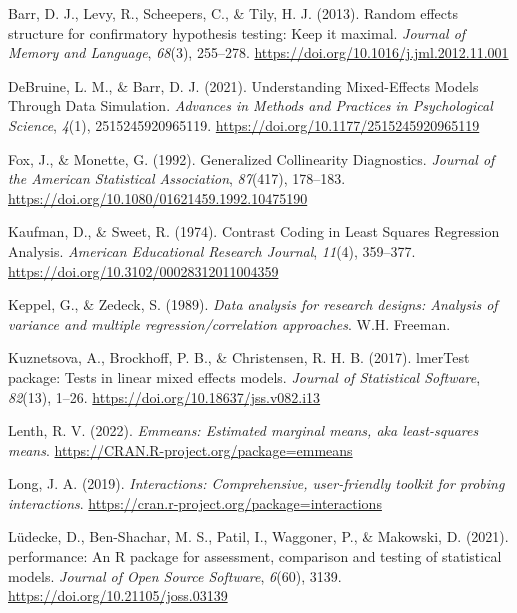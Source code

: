 \documentclass[
  bookmarksnumbered]{article}
\newlength{\cslhangindent}
\newlength{\cslentryspacingunit} %
\newenvironment{CSLReferences}[2] %
 {%
  \setlength{\parindent}{0pt}
  \ifodd #1
  \let\oldpar\par
  \def\par{\hangindent=\cslhangindent\oldpar}
  \fi
  \setlength{\parskip}{#2\cslentryspacingunit}
 }%
 {}
\begin{document}
\hypertarget{refs}{}
\begin{CSLReferences}{1}{0}
\leavevmode{}%
Barr, D. J., Levy, R., Scheepers, C., \& Tily, H. J. (2013). Random effects structure for confirmatory hypothesis testing: {Keep} it maximal. \emph{Journal of Memory and Language}, \emph{68}(3), 255--278. \url{https://doi.org/10.1016/j.jml.2012.11.001}

\leavevmode{}%
DeBruine, L. M., \& Barr, D. J. (2021). Understanding {Mixed-Effects Models Through Data Simulation}. \emph{Advances in Methods and Practices in Psychological Science}, \emph{4}(1), 2515245920965119. \url{https://doi.org/10.1177/2515245920965119}

\leavevmode{}%
Fox, J., \& Monette, G. (1992). Generalized {Collinearity Diagnostics}. \emph{Journal of the American Statistical Association}, \emph{87}(417), 178--183. \url{https://doi.org/10.1080/01621459.1992.10475190}

\leavevmode{}%
Kaufman, D., \& Sweet, R. (1974). Contrast {Coding} in {Least Squares Regression Analysis}. \emph{American Educational Research Journal}, \emph{11}(4), 359--377. \url{https://doi.org/10.3102/00028312011004359}

\leavevmode{}%
Keppel, G., \& Zedeck, S. (1989). \emph{Data analysis for research designs: {Analysis} of variance and multiple regression/correlation approaches}. {W.H. Freeman}.

\leavevmode{}%
Kuznetsova, A., Brockhoff, P. B., \& Christensen, R. H. B. (2017). {lmerTest} package: Tests in linear mixed effects models. \emph{Journal of Statistical Software}, \emph{82}(13), 1--26. \url{https://doi.org/10.18637/jss.v082.i13}

\leavevmode{}%
Lenth, R. V. (2022). \emph{Emmeans: Estimated marginal means, aka least-squares means}. \url{https://CRAN.R-project.org/package=emmeans}

\leavevmode{}%
Long, J. A. (2019). \emph{Interactions: Comprehensive, user-friendly toolkit for probing interactions}. \url{https://cran.r-project.org/package=interactions}

\leavevmode{}%
Lüdecke, D., Ben-Shachar, M. S., Patil, I., Waggoner, P., \& Makowski, D. (2021). {performance}: An {R} package for assessment, comparison and testing of statistical models. \emph{Journal of Open Source Software}, \emph{6}(60), 3139. \url{https://doi.org/10.21105/joss.03139}


\end{CSLReferences}
\end{document}
